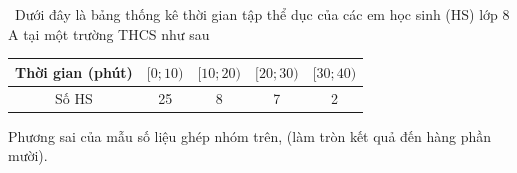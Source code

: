 \begin{bt}%
	\ Dưới đây là bảng thống kê thời gian tập thể dục của các em học sinh (HS) lớp $8$ A tại một trường THCS như sau
	\begin{center}
		\begin{tabular}{|c|c|c|c|c|}
			\hline Thời gian (phút) & {$[0 ; 10)$} & {$[10 ; 20)$} & {$[20 ; 30)$} & {$[30 ; 40)$} \\
			\hline Số HS & 25 & 8 & 7 & 2 \\
			\hline
		\end{tabular}
	\end{center}	
	Phương sai của mẫu số liệu ghép nhóm trên, (làm tròn kết quả đến hàng phần mười).
\end{bt}

